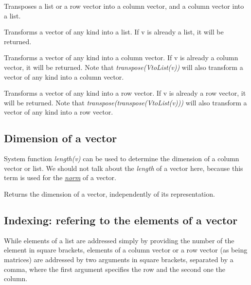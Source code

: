 \documentclass[../Maxima_Workbook.tex]{subfiles}
\begin{document}
\lzz {} \hfill {}

\lz Transposes a list or a row vector into a column vector, and a column vector into a list.

\lzz {} \hfill {}

\lz Transforms a vector of any kind into a list. If v is already a list, it will be returned.

\lzz {} \hfill {}

\lz Transforms a vector of any kind into a column vector. If v is already a column vector, it will be returned. Note that \emph{ transpose(VtoList(v)) } will also transform a vector of any kind into a column vector.

\lzz {} \hfill {}

\lz Transforms a vector of any kind into a row vector. If v is already a row vector, it will be returned. Note that \emph{ transpose(transpose(VtoList(v))) } will also transform a vector of any kind into a row vector.

\subsection{Dimension of a vector}

System function \emph{length(v)} can be used to determine the dimension of a column vector or list. We should not talk about the \emph{length} of a vector here, because this term is used for the \hyperlink{vector norm}{\emph{norm}} of a vector.

\lzz {} \hfill {}

\lz Returns the dimension of a vector, independently of its representation.

\subsection{Indexing: refering to the elements of a vector}

While elements of a list are addressed simply by providing the number of the element in square brackets, elements of a column vector or a row vector (as being matrices) are addressed by two arguments in square brackets, separated by a comma, where the first argument specifies the row and the second one the column.
\end{document}
